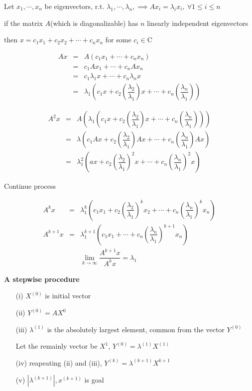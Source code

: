 \begin{tcolorbox}
	Let $x_1,\cdots,x_n$ be eigenvectors, r.t. $\lambda_1,\cdots,\lambda_n, \implies Ax_i = \lambda_ix_i ,~ \forall 1 \leq i \leq n$
	
	if the matrix $A$(which is diagonalizable) has $n$ linearly independent eigenvectors 
	
	then $x = c_1x_1 + c_2x_2 + \cdots + c_nx_n$ for some $c_i \in \mathrm{C}$
	
	\begin{eqnarray*}
		Ax &=& A(c_1x_1 + \cdots + c_nx_n)\\
		&=& c_1Ax_1 + \cdots + c_nAx_n\\
		&=& c_1 \lambda_1x+\cdots +c_n\lambda_nx\\
		&=&\lambda_1\left(c_1x+c_2\left(\dfrac{\lambda_2}{\lambda_1}\right)x + \cdots + c_n\left(\dfrac{\lambda_n}{\lambda_1}\right)\right)
	\end{eqnarray*}
	
	\begin{eqnarray*}
		A^2x &=& A\left(\lambda_1\left(c_1x+c_2\left(\dfrac{\lambda_2}{\lambda_1}\right)x+\cdots+c_n\left(\dfrac{\lambda_n}{\lambda_1}\right)\right)\right)\\
		&=& \lambda \left( c_1Ax + c_2\left(\dfrac{\lambda_2}{\lambda_1}\right)Ax+\cdots+c_n\left(\dfrac{\lambda_n}{\lambda_1}\right)Ax\right)\\
		&=& \lambda_1^2\left( ax + c_2\left(\dfrac{\lambda_2}{\lambda_1}\right)^2x + \cdots + c_n \left( \dfrac{\lambda_n}{\lambda_1}\right)^2x\right)
	\end{eqnarray*}
	\begin{center}
		Continue process	
	\end{center}
	\begin{eqnarray*}
		A^kx &=& \lambda_1^k \left( c_1x_1 + c_2\left(\dfrac{\lambda_2}{\lambda_1}\right)^kx_2+\cdots+c_n\left(\dfrac{\lambda_n}{\lambda_1}\right)^kx_n\right)\\
		A^{k+1}x &=& \lambda_1^{k+1}\left(c_1x_1+\cdots+c_n\left(\dfrac{\lambda_n}{\lambda_1}\right)^{k+1}x_n\right)\\
		&&\lim_{k \rightarrow \infty}\dfrac{A^{k+1}x}{A^kx} = \lambda_1 
	\end{eqnarray*}
	
	
\end{tcolorbox}

\newpage

\textbf{A stepwise procedure}

\begin{enumerate}
	\item[(i)] $X^{(0)}$ is initial vector
	\item[(ii)] $Y^{(0)} = AX^{0}$
	\item[(iii)] $\lambda^{(1)}$ is the absolutely largest element, common from the vector $Y^{(0)}$
	
	Let the remainly vector be $X^{1}$, $Y^(0) = \lambda^{(1)}X^{(1)}$
	\item[(iv)] reapeating (ii) and (iii), $Y^{(k)} = \lambda^{(k+1)}X^{k+1}$
	\item[(v)] $|\lambda^{(k+1)} |,x^{(k+1)}$ is goal
\end{enumerate}

